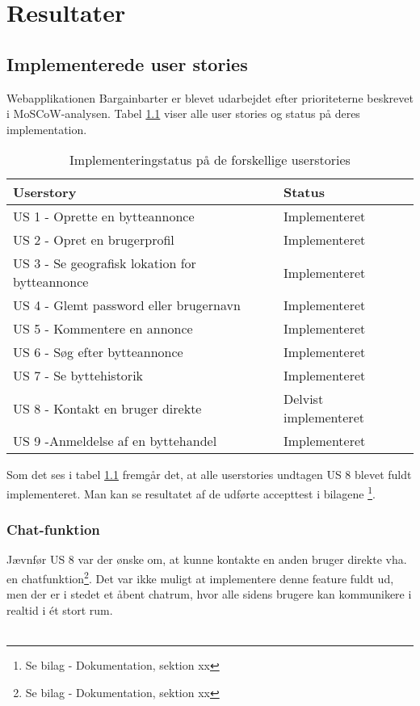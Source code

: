 \chapter{Resultater}\label{ch:Resultat og Diskussion}
\section{Implementerede user stories}
Webapplikationen Bargainbarter er blevet udarbejdet efter prioriteterne beskrevet i MoSCoW-analysen. Tabel \ref{fig:Implementeringsstatus} viser alle user stories og status på deres implementation.

\begin{table}[H]
	\begin{tabular}{ | l | p{5cm} |}
		\hline
		\textbf{Userstory}  & \textbf{Status} \\ \hline
		US 1 - Oprette en bytteannonce  & Implementeret \\ \hline
		US 2 - Opret en brugerprofil & Implementeret \\ \hline
		US 3 - Se geografisk lokation for bytteannonce & Implementeret \\ \hline
		US 4 - Glemt password eller brugernavn & Implementeret \\ \hline
		US 5 - Kommentere en annonce & Implementeret \\ \hline
		US 6 - Søg efter bytteannonce & Implementeret \\ \hline
		US 7 - Se byttehistorik & Implementeret \\ \hline	
		US 8 - Kontakt en bruger direkte & Delvist implementeret \\ \hline	
		US 9 -Anmeldelse af en byttehandel & Implementeret \\ \hline	
	\end{tabular}
\caption{Implementeringstatus på de forskellige userstories}
\label{fig:Implementeringsstatus}
\end{table}

Som det ses i tabel \ref{fig:Implementeringsstatus} fremgår det, at alle userstories undtagen  US 8 blevet fuldt implementeret. Man kan se resultatet af de udførte accepttest i bilagene \footnote{Se bilag - Dokumentation, sektion xx}.

\subsection{Chat-funktion}
Jævnfør US 8 var der ønske om, at kunne kontakte en anden bruger direkte vha. en chatfunktion\footnote{Se bilag - Dokumentation, sektion xx}. Det var ikke muligt at implementere denne feature fuldt ud, men der er i stedet et åbent chatrum, hvor alle sidens brugere kan kommunikere i realtid i ét stort rum.\\ \\

